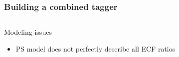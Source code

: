 \documentclass[aspectratio=169,xcolor=dvipsnames,,table,compress]{beamer}
\begin{document}
\begin{frame}[t] \frametitle{Building a combined tagger}
  \vspace{-5mm}
  \begin{columns}[T]
  \begin{column}{0.33\textwidth}
  \centering 
    Modeling issues \\  
    \begin{itemize}
      \item {\small PS model does not perfectly describe all ECF ratios}
    \end{itemize}

\end{column}
\end{columns}
\end{frame}
\end{document}
